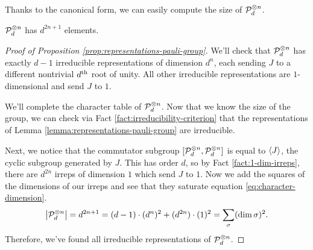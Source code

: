 Thanks to the canonical form, we can easily compute the size of $\mathcal P_d^{\otimes n}$.
\begin{cor}
	$\mathcal P_d^{\otimes n}$ has $d^{2n+1}$ elements.
\end{cor}
\begin{proof}[Proof of Proposition \ref{prop:representations-pauli-group}]
	We'll check that $\mathcal P_d^{\otimes n}$ has exactly $d-1$ irreducible representations of dimension $d^{n}$, each sending $J$ to a different nontrivial $d\textsuperscript{th}$ root of unity. All other irreducible representations are $1$-dimensional and send $J$ to $1$. 

	We'll complete the character table of $\mathcal P_d^{\otimes n}$. Now that we know the size of the group, we can check via Fact \ref{fact:irreducibility-criterion} that the representations of Lemma \ref{lemma:representations-pauli-group} are irreducible. 

	Next, we notice that the commutator subgroup $[\mathcal P_d^{\otimes n},\mathcal P_d^{\otimes n}]$ is equal to $\braket J$, the cyclic subgroup generated by $J$. This has order $d$, so by Fact \ref{fact:1-dim-irreps}, there are $d^{2n}$ irreps of dimension $1$ which send $J$ to $1$. Now we add the squares of the dimensions of our irreps and see that they saturate equation \eqref{eq:character-dimension}.
	\begin{equation}
		\left\vert\mathcal P_d^{\otimes n}\right\vert = d^{2n+1} = (d-1)\cdot (d^n)^2 + (d^{2n})\cdot(1)^2 = \sum_\sigma (\dim \sigma)^2.
	\end{equation}
	Therefore, we've found all irreducible representations of $\mathcal P_d^{\otimes n}$. 
\end{proof}


